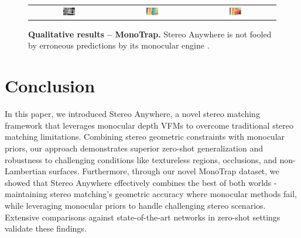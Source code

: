 \documentclass[10pt,twocolumn,letterpaper]{article}
\newcommand{\method}[0]{Stereo Anywhere\xspace}
\newcommand{\dataset}[0]{MonoTrap\xspace}
\begin{document}
\begin{figure}[t]
\begin{tabular}{ccc}
        \includegraphics[width=0.16\textwidth]{imgs/monotrap_samples/rgb/30.jpg} &
        \includegraphics[width=0.16\textwidth]{imgs/monotrap_samples/mono/30.jpg} &
        \includegraphics[width=0.16\textwidth]{imgs/monotrap_samples/Ours/30.jpg} \\

    \end{tabular}\vspace{-0.2cm}
    \caption{\textbf{Qualitative results -- \dataset.} \method is not fooled by erroneous predictions by its monocular engine \cite{depth_anything_v2}. }
    \label{fig:qual_monotrap}\vspace{-0.3cm}
\end{figure}

\section{Conclusion}
\label{sec:conclusion}

In this paper, we introduced \method, a novel stereo matching framework that leverages monocular depth VFMs to overcome traditional stereo matching limitations. Combining stereo geometric constraints with monocular priors, our approach demonstrates superior zero-shot generalization and robustness to challenging conditions like textureless regions, occlusions, and non-Lambertian surfaces. Furthermore, through our novel MonoTrap dataset, we showed that \method effectively combines the best of both worlds - maintaining stereo matching's geometric accuracy where monocular methods fail, while leveraging monocular priors to handle challenging stereo scenarios. Extensive comparisons against state-of-the-art networks in zero-shot settings validate these findings.

{
    \small
    
    
}

\clearpage
%
\onecolumn
\end{document}
